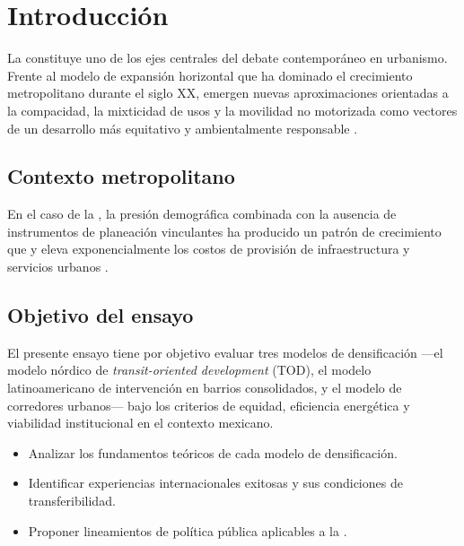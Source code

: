 
\section{Introducción}

La  constituye uno de los ejes centrales del debate contemporáneo en urbanismo.
Frente al modelo de expansión horizontal que ha dominado el crecimiento metropolitano durante el siglo XX,
emergen nuevas aproximaciones orientadas a la compacidad, la mixticidad de usos y la movilidad no motorizada
como vectores de un desarrollo más equitativo y ambientalmente responsable \cite{lore2024densidad}.

\lipsum[2]

\subsection{Contexto metropolitano}

En el caso de la \zmvm, la presión demográfica combinada con la ausencia de instrumentos de planeación vinculantes
ha producido un patrón de crecimiento que  y eleva exponencialmente los costos
de provisión de infraestructura y servicios urbanos \cite{lore2024zmvm}.

\lipsum[3]

\subsection{Objetivo del ensayo}

El presente ensayo tiene por objetivo evaluar tres modelos de densificación —el modelo nórdico de
\textit{transit-oriented development} (TOD), el modelo latinoamericano de intervención en barrios
consolidados, y el modelo de corredores urbanos— bajo los criterios de equidad, eficiencia energética
y viabilidad institucional en el contexto mexicano.

\begin{itemize}
    \item Analizar los fundamentos teóricos de cada modelo de densificación.
    \item Identificar experiencias internacionales exitosas y sus condiciones de transferibilidad.
    \item Proponer lineamientos de política pública aplicables a la \zmvm.
\end{itemize}

\lipsum[4]

